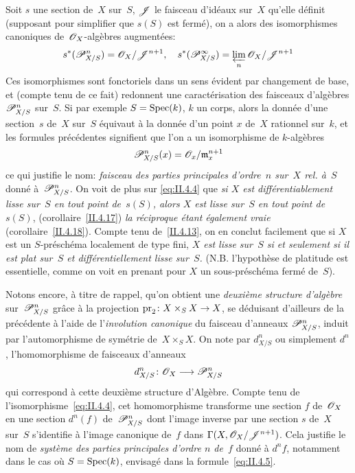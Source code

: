 \begin{remarques}
Soit $s$ une section de~$X$ sur~$S$, $\cal{J}$ le faisceau
d'id\'eaux sur~$X$ qu'elle d\'efinit (supposant
pour simplifier que $s(S)$ est ferm\'e), on a alors des
isomorphismes canoniques de~$\cal{O}_X$-alg\`ebres augment\'ees:
\begin{equation}
\label{eq:II.4.4}
s^*(\cal{P}_{X/S}^n)=\cal{O}_X/\cal{J}^{n+1}\quoi,\quad
s^*(\cal{P}_{X/S}^{\infty})= \varprojlim_{n}
\cal{O}_X/\cal{J}^{n+1}
\end{equation}
Ces isomorphismes sont fonctoriels dans un sens \'evident par
changement de base, et (compte tenu de ce fait) redonnent une
caract\'erisation des faisceaux d'alg\`ebres $\cal{P}_{X/S}^n$ sur~$S$. Si par exemple $S=\operatorname{Spec}(k)$, $k$ un corps, alors la donn\'ee
d'une section~$s$ de~$X$ sur~$S$ \'equivaut \`a la donn\'ee d'un
point $x$ de~$X$ rationnel sur~$k$, et les formules
pr\'ec\'edentes signifient que l'on a un isomorphisme de
$k$-alg\`ebres
\begin{equation}
\label{eq:II.4.5}
\cal{P}_{X/S}^n(x)=\cal{O}_x/\goth{m}_x^{n+1}
\end{equation}
ce qui justifie le nom: \og \emph{faisceau des parties principales
d'ordre~$n$ sur~$X$ rel. à~$S$}\fg
{}\label{indnot:ad1}donn\'e \`a~$\cal{P}_{X/S}^n$. On voit de plus sur
\eqref{eq:II.4.4} que \emph{si $X$ est différentiablement lisse
sur~$S$ en tout point de~$s(S)$, alors $X$ est lisse sur~$S$ en tout
point de~$s(S)$}, (corollaire~\ref{II.4.17}) \emph{la réciproque
étant également vraie} (corollaire~\ref{II.4.18}). Compte tenu
de~\ref{II.4.13}, on en conclut facilement que si $X$ est un
$S$-pr\'esch\'ema localement de type fini, \emph{$X$ est lisse sur~$S$ si et seulement si il est plat sur~$S$ et différentiellement
lisse sur~$S$.} (N.B. l'hypoth\`ese de platitude est essentielle,
comme on voit en prenant pour $X$ un sous-pr\'esch\'ema ferm\'e
de~$S$).

Notons encore, \`a titre de rappel, qu'on obtient une
\emph{deuxième structure d'algèbre} sur~$\cal{P}_{X/S}^n$
gr\^ace \`a la projection $\pr_2\colon X\times_S X\to X$,
se d\'eduisant d'ailleurs de la pr\'ec\'edente \`a l'aide de
l'\emph{involution canonique} du faisceau d'anneaux $\cal{P}_{X/S}^n$,
induit par l'automorphisme de sym\'etrie de~$X\times_S X$. On note
par $d_{X/S}^n$
\label{indnot:bb}ou simplement $d^n$, l'homomorphisme de faisceaux d'anneaux
\begin{equation}
\label{eq:II.4.6}
d_{X/S}^n\colon \cal{O}_X\to\cal{P}_{X/S}^n
\end{equation}
qui correspond \`a cette deuxi\`eme structure
d'Alg\`ebre. Compte tenu de l'isomorphisme~\eqref{eq:II.4.4}, cet
homomorphisme transforme une section $f$ de~$\cal{O}_X$ en une section
$d^n(f)$ de~$\cal{P}_{X/S}^n$ dont l'image inverse par une section $s$
de~$X$ sur~$S$ s'identifie \`a l'image canonique de~$f$ dans
$\Gamma(X,\cal{O}_X/\cal{J}^{n+1})$. Cela justifie le nom de
\og \emph{système des parties principales d'ordre $n$ de~$f$}\fg
{}donn\'e \`a $d^nf$, notamment dans le cas o\`u $S=\operatorname{Spec}(k)$,
envisag\'e dans la formule~\eqref{eq:II.4.5}.


\end{remarques}
